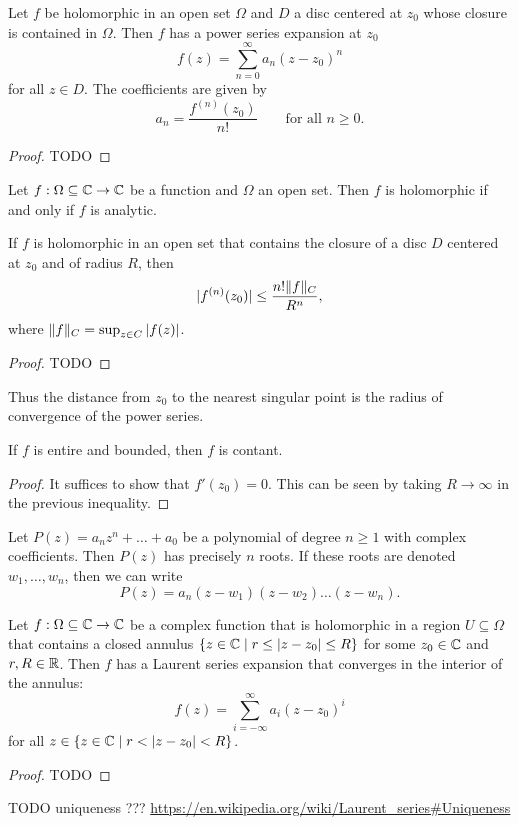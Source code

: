 \begin{proposition} \label{holomorphicFunctionIsAnalytic}
Let $f$ be holomorphic in an open set $\Omega$ and $D$ a
disc centered at $z_0$ whose closure is contained in $\Omega$. Then $f$ has a power series expansion at $z_0$
\[ f(z) = \sum_{n=0}^\infty a_n(z-z_0)^n \]
for all $z\in D$. The coefficients are given by
\[ a_n = \frac{f^{(n)}(z_0)}{n!} \qquad \text{for all $n\geq 0$}. \]
\end{proposition}
\begin{proof}
TODO
\end{proof}
\begin{corollary}
Let $f: \Omega\subseteq \mathbb{C} \to \mathbb{C}$ be a function and $\Omega$ an open set. Then $f$ is holomorphic \textup{if and only if} $f$ is analytic.
\end{corollary}
\begin{corollary}
If $f$ is holomorphic in an open
set that contains the closure of a disc $D$ centered at $z_0$ and of radius $R$,
then
\[  |f^{(n)}(z_0)| \leq \frac{n!\lVert f\rVert_C}{R^n}, \]
where $\lVert f\rVert_C = \sup_{z\in C}|f(z)|$.
\end{corollary}
\begin{proof}
TODO
\end{proof}
Thus the distance from $z_0$ to the nearest singular point is the radius of convergence of the power series.
\begin{corollary} \label{liouvilleTheoremAnalysis}
If $f$ is entire and bounded, then $f$ is contant.
\end{corollary}
\begin{proof}
It suffices to show that $f'(z_0) = 0$. This can be seen by taking $R\to\infty$ in the previous inequality.
\end{proof}
\begin{corollary}
Let $P(z) = a_nz^n + \ldots + a_0$ be a polynomial of degree $n\geq 1$ with complex coefficients. Then $P(z)$ has precisely $n$ roots. If these roots are denoted $w_1, \ldots, w_n$, then we can write
\[ P(z) = a_n(z-w_1)(z-w_2)\ldots(z-w_n). \]
\end{corollary}

\begin{proposition}
Let $f: \Omega\subseteq \mathbb{C}\to \mathbb{C}$ be a complex function that is holomorphic in a region $U\subseteq \Omega$ that contains a closed annulus $\setbuilder{z\in \C}{r\leq|z-z_0|\leq R}$ for some $z_0\in \mathbb{C}$ and $r,R\in \mathbb{R}$. Then $f$ has a Laurent series expansion that converges in the interior of the annulus:
\[ f(z) = \sum_{i=-\infty}^\infty a_i(z-z_0)^i \]
for all $z\in \setbuilder{z\in \C}{r < |z-z_0| < R}$.
\end{proposition}
\begin{proof}
TODO
\end{proof}
TODO uniqueness ??? \url{https://en.wikipedia.org/wiki/Laurent_series#Uniqueness}

